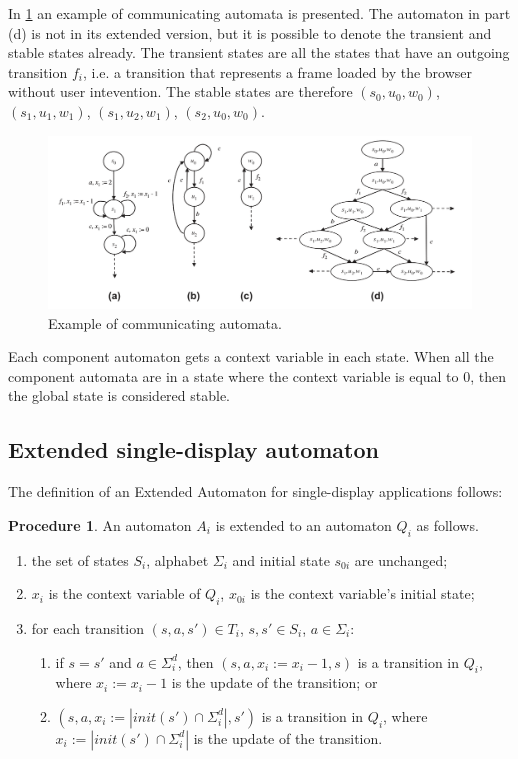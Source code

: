 \documentclass[a4paper,10pt]{article}
\theoremstyle{plain} %
\theoremstyle{definition}
\newtheorem{procedure}{Procedure}
\theoremstyle{remark}
\begin{document}
In \cref{fig:example-communicating-automata} an example of communicating automata is presented. The automaton in part (d) is not in its extended version, but it is possible to denote the transient and stable states already. The transient states are all the states that have an outgoing transition $f_i$, i.e. a transition that represents a frame loaded by the browser without user intevention. The stable states are therefore $(s_0,u_0,w_0)$, $(s_1,u_1,w_1)$, $(s_1,u_2,w_1)$, $(s_2,u_0,w_0)$.

\begin{figure}[h]
  \includegraphics[width=\textwidth]{img/communicating_automata_example.png}
  \caption{Example of communicating automata.}
  \label{fig:example-communicating-automata}
\end{figure}

Each component automaton gets a context variable in each state. When all the component automata are in a state where the context variable is equal to 0, then the global state is considered stable.

\subsection{Extended single-display automaton}

The definition of an Extended Automaton for single-display applications follows:

\begin{procedure}
  \label{extended-single-automaton}
  An automaton $A_i$ is extended to an automaton $Q_i$ as follows.

  \begin{enumerate}
    \item the set of states $S_i$, alphabet $\Sigma_i$ and initial state $s_{0i}$ are unchanged;
    \item $x_i$ is the context variable of $Q_i$, $x_{0i}$ is the context variable's initial state;
    \item for each transition $(s,a,s')\in T_i$, $s,s'\in S_i$, $a\in\Sigma_i$:
      \begin{enumerate}
        \item if $s=s'$ and $a\in\Sigma^d_i$, then $(s,a,x_i := x_i - 1,s)$ is a transition in $Q_i$, where $x_i := x_i - 1$ is the update of the transition; or
        \item $(s,a,x_i := |init(s')\cap \Sigma^d_i|,s')$ is a transition in $Q_i$, where $x_i := |init(s')\cap\Sigma^d_i|$ is the update of the transition.
      \end{enumerate}
  \end{enumerate}
\end{procedure}
\end{document}
